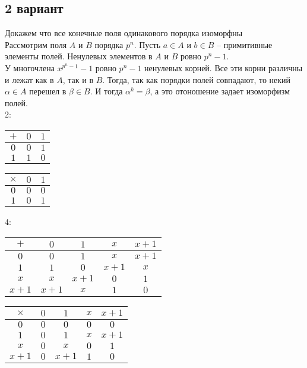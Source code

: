 	\subsection{2 вариант}
		Докажем что все конечные поля одинакового порядка изоморфны\\
		Рассмотрим поля $A$ и $B$ порядка $p^n$. Пусть $a \in A$ и $b \in B$ -- примитивные элементы полей. Ненулевых элементов в $A$ и $B$ ровно $p^n - 1$. \\
		У многочлена $x^{p^n - 1} - 1$ ровно $p^n - 1$ ненулевых корней. Все эти корни различны и лежат как в $A$, так и в $B$. Тогда, так как порядки полей совпадают, то некий $\alpha \in A$ перешел в $\beta \in B$. И тогда $\alpha^k = \beta$, а это отоношение задает изоморфизм полей.
		\\
		2:
		\begin{center}
			\begin{tabular}{|c|c|c|}
				\hline
				$+ $&$ 0 $&$ 1 $\\
				\hline
				$0 $&$ 0 $&$ 1 $\\
				\hline
				$1 $&$ 1 $&$ 0 $\\
				\hline
			\end{tabular}
		\end{center}
		\begin{center}
			\begin{tabular}{|c|c|c|}
				\hline
				$\times $&$ 0 $&$ 1 $\\
				\hline
				$0 $&$ 0 $&$ 0 $\\
				\hline
				$1 $&$ 0 $&$ 1 $\\
				\hline
			\end{tabular}
		\end{center}		
		4:
		\begin{center}
			\begin{tabular}{|c|c|c|c|c|}
				\hline
				$+ $&$ 0 $&$ 1 $&$ x $&$ x+1 $\\
				\hline
				$0 $&$ 0 $&$ 1 $&$ x $&$ x+1$\\
				\hline
				$1 $&$ 1 $&$ 0 $&$ x+1 $&$ x$\\
				\hline
				$x $&$ x $&$ x+1 $&$ 0 $&$ 1$\\
				\hline
				$x+1 $&$ x+1 $&$ x $&$ 1 $&$ 0$\\
				\hline
			\end{tabular}
		\end{center}
		\begin{center}
			\begin{tabular}{|c|c|c|c|c|}
				\hline
				$\times $&$ 0 $&$ 1 $&$ x $&$ x+1 $\\
				\hline
				$0 $&$ 0 $&$ 0 $&$ 0 $&$ 0$\\
				\hline
				$1 $&$ 0 $&$ 1 $&$ x $&$ x+1$\\
				\hline
				$x $&$ 0 $&$ x $&$ 0 $&$ 1$\\
				\hline
				$x+1 $&$ 0 $&$ x+1 $&$ 1 $&$ 0$\\
				\hline
			\end{tabular}
		\end{center}	

